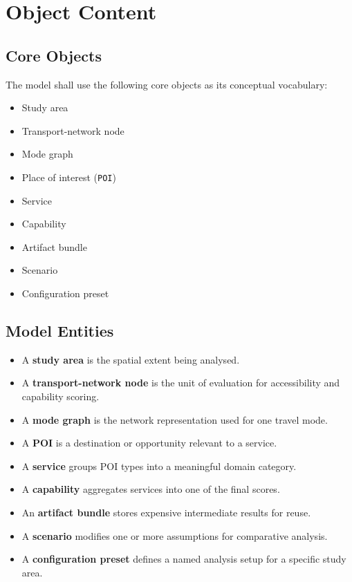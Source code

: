 \documentclass[11pt]{article}
\begin{document}
\section{Object Content}

\subsection*{Core Objects}

The model shall use the following core objects as its conceptual vocabulary:

\begin{itemize}
  \item Study area
  \item Transport-network node
  \item Mode graph
  \item Place of interest (\texttt{POI})
  \item Service
  \item Capability
  \item Artifact bundle
  \item Scenario
  \item Configuration preset
\end{itemize}

\subsection*{Model Entities}

\begin{itemize}
  \item A \textbf{study area} is the spatial extent being analysed.
  \item A \textbf{transport-network node} is the unit of evaluation for accessibility and capability scoring.
  \item A \textbf{mode graph} is the network representation used for one travel mode.
  \item A \textbf{POI} is a destination or opportunity relevant to a service.
  \item A \textbf{service} groups POI types into a meaningful domain category.
  \item A \textbf{capability} aggregates services into one of the final scores.
  \item An \textbf{artifact bundle} stores expensive intermediate results for reuse.
  \item A \textbf{scenario} modifies one or more assumptions for comparative analysis.
  \item A \textbf{configuration preset} defines a named analysis setup for a specific study area.
\end{itemize}
\end{document}
